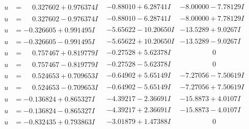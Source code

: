 \documentclass[1p]{elsarticle_modified}
\theoremstyle{definition}
\begin{document}
$$\begin{array}{c|c|c}
\begin{aligned}
u &= \phantom{-}0.327602 + 0.976374 I\end{aligned}
 & -0.88010 + 6.28741 I & -8.00000 - 7.78129 I \\ \hline\begin{aligned}
u &= \phantom{-}0.327602 - 0.976374 I\end{aligned}
 & -0.88010 - 6.28741 I & -8.00000 + 7.78129 I \\ \hline\begin{aligned}
u &= -0.326605 + 0.991495 I\end{aligned}
 & -5.65622 - 10.20650 I & -13.5289 + 9.0267 I \\ \hline\begin{aligned}
u &= -0.326605 - 0.991495 I\end{aligned}
 & -5.65622 + 10.20650 I & -13.5289 - 9.0267 I \\ \hline\begin{aligned}
u &= \phantom{-}0.757467 + 0.819779 I\end{aligned}
 & -0.27528 + 5.62378 I & \phantom{-0.000000 } 0 \\ \hline\begin{aligned}
u &= \phantom{-}0.757467 - 0.819779 I\end{aligned}
 & -0.27528 - 5.62378 I & \phantom{-0.000000 } 0 \\ \hline\begin{aligned}
u &= \phantom{-}0.524653 + 0.709653 I\end{aligned}
 & -0.64902 + 5.65149 I & -7.27056 - 7.50619 I \\ \hline\begin{aligned}
u &= \phantom{-}0.524653 - 0.709653 I\end{aligned}
 & -0.64902 - 5.65149 I & -7.27056 + 7.50619 I \\ \hline\begin{aligned}
u &= -0.136824 + 0.865327 I\end{aligned}
 & -4.39217 - 2.36691 I & -15.8873 + 4.0107 I \\ \hline\begin{aligned}
u &= -0.136824 - 0.865327 I\end{aligned}
 & -4.39217 + 2.36691 I & -15.8873 - 4.0107 I \\ \hline\begin{aligned}
u &= -0.832435 + 0.793863 I\end{aligned}
 & -3.01879 + 1.47388 I & \phantom{-0.000000 } 0 \\ \hline\begin{aligned}

\end{aligned}
\end{array}$$
\end{document}
